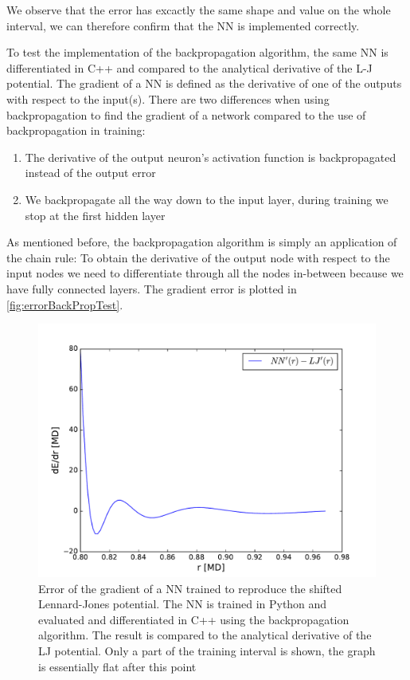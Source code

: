 \documentclass[twoside,english]{uiofysmaster}
\begin{document}
We observe that the error has excactly the same shape and value on the whole interval, we can therefore
confirm that the NN is implemented correctly. 

To test the implementation of the backpropagation algorithm, the
same NN is differentiated in C++ and compared to the analytical derivative of the L-J potential. 
The gradient of a NN is defined as the derivative of one of the outputs with respect to the input(s). 
There are two differences when using backpropagation to find the gradient of a network compared
to the use of backpropagation in training:
\begin{enumerate}
 \item The derivative of the output neuron's activation function is backpropagated instead of the output error
 \item We backpropagate all the way down to the input layer, during training we stop at the first hidden layer
\end{enumerate}
As mentioned before, the backpropagation algorithm is simply an application of the chain rule: 
To obtain the derivative of the output node with respect to the input nodes we need to differentiate through
all the nodes in-between because we have fully connected layers. The gradient error is plotted in 
\autoref{fig:errorBackPropTest}.
\begin{figure}[H]
\centering
  \includegraphics[width = 0.9\linewidth]{Figures/Tests/errorDerivative.pdf}
  \caption{Error of the gradient of a NN trained to reproduce the shifted Lennard-Jones potential.
	   The NN is trained in Python and evaluated and differentiated in C++ using the backpropagation algorithm.
	   The result is compared to the analytical derivative of the LJ potential. Only a part of the training
	   interval is shown, the graph is essentially flat after this point} 
  \label{fig:errorBackPropTest}
\end{figure}
\end{document}
